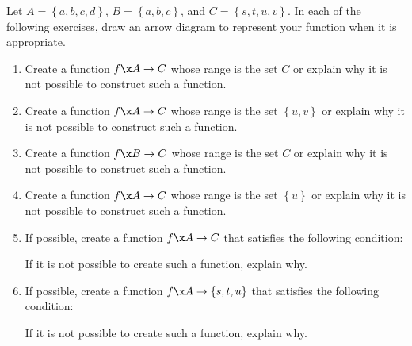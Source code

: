 \begin{activity} \label{A:creatingfunctions} \hfill

Let  $A = \left\{ {a,b,c,d} \right\}$, $B = \left\{ {a,b,c} \right\}$, and  
$C = \left\{ {s,t,u,v} \right\}$.  In each of the following exercises, draw an arrow diagram to represent your function when it is appropriate.
\begin{enumerate}
\item Create a function  $f\x A \to C$ whose range is the set   $C$  or explain why it is not possible to construct such a function.

\item Create a function  $f\x A \to C$ whose range is the set  $\left\{ {u, v} \right\}$ or explain why it is not possible to construct such a function.

\item Create a function  $f\x B \to C$ whose range is the set   $C$  or explain why it is not possible to construct such a function.

\item Create a function  $f\x A \to C$ whose range is the set  $\left\{ u \right\}$ or explain why it is not possible to construct such a function.

\item If possible, create a function  $f\x A \to C$  that satisfies the following condition:
If it is not possible to create such a function, explain why.

\item If possible, create a function  $f\x A \to \left\{ {s, t, u} \right\}$ that satisfies the following condition:


If it is not possible to create such a function, explain why.
\end{enumerate}
\end{activity}
\hbreak
